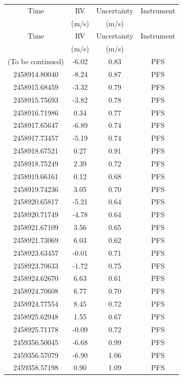 \documentclass[twocolumn]{aastex631}
\begin{document}
\begin{tabularx}{\linewidth}{cccc}
\label{tab:rv-data-points} \\
\caption{RV measurements} \\
\toprule
Time & RV & Uncertainty & Instrument\\
 & (m/s) & (m/s) &  \\
\midrule
\endfirsthead
\toprule
Time & RV & Uncertainty & Instrument\\
 & (m/s) & (m/s) &  \\
\midrule
\endhead
\midrule
\multicolumn{1}{l}{\footnotesize(To be continued)}
\endfoot
\bottomrule
\endlastfoot
2458914.68102 & -6.02 & 0.83 & PFS \\
2458914.80040 & -8.24 & 0.87 & PFS \\
2458915.68459 & -3.32 & 0.79 & PFS \\
2458915.75693 & -3.82 & 0.78 & PFS \\
2458916.71986 & 0.34 & 0.77 & PFS \\
2458917.65647 & -6.89 & 0.74 & PFS \\
2458917.73457 & -5.19 & 0.74 & PFS \\
2458918.67521 & 0.27 & 0.91 & PFS \\
2458918.75249 & 2.39 & 0.72 & PFS \\
2458919.66161 & 0.12 & 0.68 & PFS \\
2458919.74236 & 3.05 & 0.70 & PFS \\
2458920.65817 & -5.21 & 0.64 & PFS \\
2458920.71749 & -4.78 & 0.64 & PFS \\
2458921.67109 & 3.56 & 0.65 & PFS \\
2458921.73069 & 6.03 & 0.62 & PFS \\
2458923.63457 & -0.01 & 0.71 & PFS \\
2458923.70633 & -1.72 & 0.75 & PFS \\
2458924.62670 & 6.63 & 0.61 & PFS \\
2458924.70608 & 6.77 & 0.70 & PFS \\
2458924.77554 & 8.45 & 0.72 & PFS \\
2458925.62948 & 1.55 & 0.67 & PFS \\
2458925.71178 & -0.09 & 0.72 & PFS \\
2459356.50045 & -6.68 & 0.99 & PFS \\
2459356.57079 & -6.90 & 1.06 & PFS \\
2459358.57198 & 0.90 & 1.09 & PFS \\

\end{tabularx}
\end{document}
